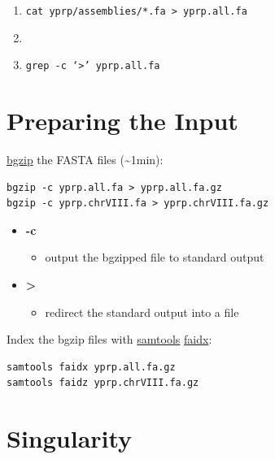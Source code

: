 \documentclass[
]{book}
\providecommand{\tightlist}{%
  \setlength{\itemsep}{0pt}\setlength{\parskip}{0pt}}
\begin{document}
\begin{enumerate}
\def\labelenumi{\arabic{enumi}.}
\tightlist
\item
  \texttt{cat\ yprp/assemblies/*.fa\ \textgreater{}\ yprp.all.fa}
\item
\item
  \texttt{grep\ -c\ ‘\textgreater{}’\ yprp.all.fa}
\end{enumerate}

\hypertarget{preparing-the-input-2}{%
\section{Preparing the Input}\label{preparing-the-input-2}}

\href{https://www.htslib.org/doc/bgzip.html}{bgzip} the FASTA files (\textasciitilde1min):

\begin{verbatim}
bgzip -c yprp.all.fa > yprp.all.fa.gz
bgzip -c yprp.chrVIII.fa > yprp.chrVIII.fa.gz
\end{verbatim}

\begin{itemize}
\tightlist
\item
  \textbf{-c}

  \begin{itemize}
  \tightlist
  \item
    output the bgzipped file to standard output
  \end{itemize}
\item
  \textbf{\textgreater{}}

  \begin{itemize}
  \tightlist
  \item
    redirect the standard output into a file
  \end{itemize}
\end{itemize}

Index the bgzip files with \href{http://www.htslib.org/doc/samtools.html}{samtools} \href{http://www.htslib.org/doc/samtools-faidx.html}{faidx}:

\begin{verbatim}
samtools faidx yprp.all.fa.gz
samtools faidz yprp.chrVIII.fa.gz
\end{verbatim}

\hypertarget{singularity}{%
\section{Singularity}\label{singularity}}
\end{document}
